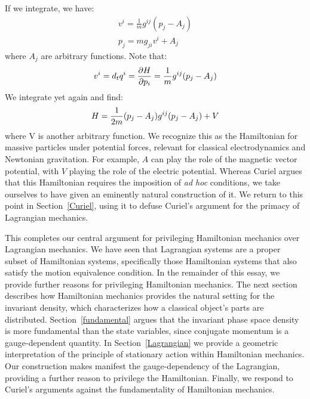 \documentclass[letterpaper]{article}
\begin{document}
If we integrate, we have:
\begin{equation} \label{linear_relationship}
\begin{aligned}
v^i = \frac{1}{m} g^{ij}(p_j - A_j) \\
p_j = m g_{ji} v^i + A_j
\end{aligned}
\end{equation}
where $A_j$ are arbitrary functions. Note that:
\begin{equation}
v^i = d_t q^i = \frac{\partial H }{\partial p_i} = \frac{1}{m} g^{ij}(p_j - A_j) \\
\end{equation}
We integrate yet again and find:
\begin{equation} \label{massive_Hamiltonian}
H = \frac{1}{2m} (p_j - A_j) g^{ij}(p_j - A_j) + V \\
\end{equation}
where V is another arbitrary function. We recognize this as the Hamiltonian for massive particles under potential forces, relevant for classical electrodynamics and Newtonian gravitation. For example, $A$ can play the role of the magnetic vector potential, with $V$ playing the role of the electric potential. Whereas Curiel \parencites*[]{Curiel} argues that this Hamiltonian requires the imposition of \textit{ad hoc} conditions, we take ourselves to have given an eminently natural construction of it. We return to this point in Section~\ref{Curiel}, using it to defuse Curiel's argument for the primacy of Lagrangian mechanics.

This completes our central argument for privileging Hamiltonian mechanics over Lagrangian mechanics. We have seen that Lagrangian systems are a proper subset of Hamiltonian systems, specifically those Hamiltonian systems that also satisfy the motion equivalence condition. In the remainder of this essay, we provide further reasons for privileging Hamiltonian mechanics. The next section describes how Hamiltonian mechanics provides the natural setting for the invariant density, which characterizes how a classical object's parts are distributed. Section~\ref{fundamental} argues that the invariant phase space density is more fundamental than the state variables, since conjugate momentum is a gauge-dependent quantity. In Section~\ref{Lagrangian} we provide a geometric interpretation of the principle of stationary action within Hamiltonian mechanics. Our construction makes manifest the gauge-dependency of the Lagrangian, providing a further reason to privilege the Hamiltonian. Finally, we respond to Curiel's arguments against the fundamentality of Hamiltonian mechanics.
\end{document}
